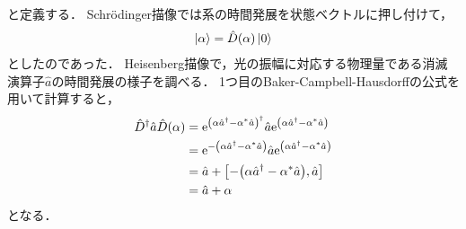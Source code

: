 \documentclass{report}
\begin{document}
    と定義する．
    Schr\"odinger描像では系の時間発展を状態ベクトルに押し付けて，
    \begin{align}
      \ket{\alpha} = \hat{D}(\alpha)\ket{0}
    \end{align}
    としたのであった．
    Heisenberg描像で，光の振幅に対応する物理量である消滅演算子$\hat{a}$の時間発展の様子を調べる．
    1つ目のBaker-Campbell-Hausdorffの公式を用いて計算すると，
    \begin{align}
      \hat{D}^{\dag}\hat{a}\hat{D}(\alpha) &= \mathrm{e}^{\qty(\alpha\hat{a}^{\dag} - \alpha^*\hat{a})^{\dag}}\hat{a}\mathrm{e}^{\qty(\alpha\hat{a}^{\dag} - \alpha^*\hat{a})} \\ 
      &= \mathrm{e}^{-\qty(\alpha\hat{a}^{\dag} - \alpha^*\hat{a})}\hat{a}\mathrm{e}^{\qty(\alpha\hat{a}^{\dag} - \alpha^*\hat{a})} \\ 
      &= \hat{a} + \qty[-\qty(\alpha\hat{a}^{\dag} - \alpha^*\hat{a}), \hat{a}] \\ 
      &= \hat{a} + \alpha
    \end{align}
    となる．
\end{document}

